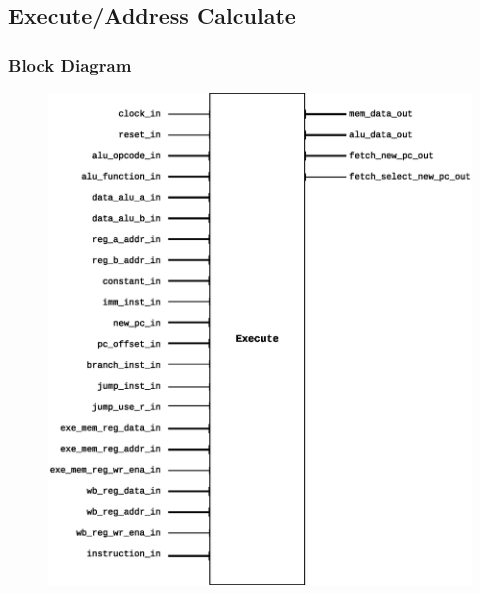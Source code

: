 \documentclass{article}
\begin{document}
  
  \newpage
  \subsection{Execute/Address Calculate}
  \subsubsection{Block Diagram}
  \begin{figure}[H]
    \centering
    \includegraphics[width=\linewidth]{pictures/blocks/ex_block.eps}
  \end{figure} 
\end{document}
